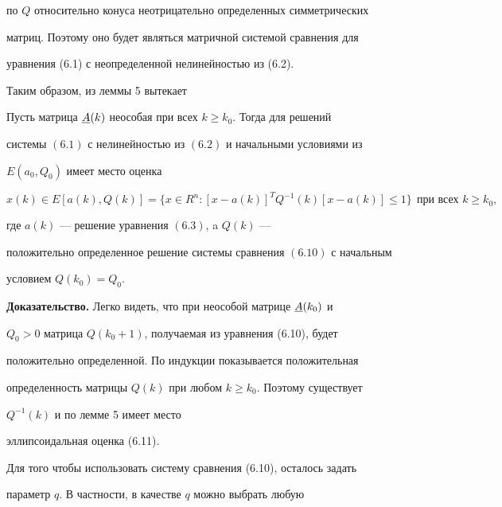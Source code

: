 по $Q$ относительно конуса неотрицательно определенных симметрических


матриц. Поэтому оно будет являться матричной системой сравнения для


уравнения (6.1) с неопределенной нелинейностью из (6.2).





Таким образом, из леммы 5 вытекает





\begin{thm}


Пусть матрица $\underline A(k)$ неособая при всех $k\ge k_0$. Тогда для решений


системы $(6.1)$ с нелинейностью из $(6.2)$ и начальными условиями из


$E(a_0,Q_0)$ имеет место оценка


\begin{equation}


x(k)\in E[a(k),Q(k)]=\{x\in R^n:[x-a(k)]^T Q^{-1}(k)


[x-a(k)]\le1\} \ \ \text{при всех $k\ge k_0$},


\end{equation}


где $a(k)$ --- решение уравнения $(6.3)$, a $Q(k)$ ---


положительно определенное решение системы сравнения $(6.10)$ с начальным


условием $Q(k_0)=Q_0$.


\end{thm}





{\bf Доказательство.} Легко видеть, что при неособой матрице $\underline A(k_0)$ и


$Q_0>0$ матрица $Q(k_0+1)$, получаемая из уравнения (6.10), будет


положительно определенной. По индукции показывается положительная


определенность матрицы $Q(k)$ при любом $k\ge k_0$. Поэтому существует


$Q^{-1}(k)$ и по лемме 5 имеет место


эллипсоидальная оценка (6.11).





Для того чтобы использовать систему сравнения (6.10), осталось задать


параметр $q$. В частности, в качестве $q$ можно выбрать любую



